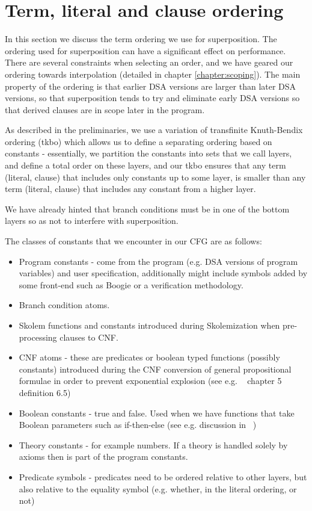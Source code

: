 

\section{Term, literal and clause ordering}\label{section:gfole:ordering}
In this section we discuss the term ordering we use for superposition. The ordering used for superposition can have a significant effect on performance. There are several constraints when selecting an order, and we have geared our ordering towards interpolation (detailed in chapter \ref{chapter:scoping}). The main property of the ordering is that earlier DSA versions are larger than later DSA versions, so that superposition tends to try and eliminate early DSA versions so that derived clauses are in scope later in the program.

As described in the preliminaries, we use a variation of transfinite Knuth-Bendix ordering (tkbo) which allows us to define a separating ordering based on constants - essentially, we partition the constants into sets that we call layers, and define a total order on these layers, and our tkbo ensures that any term (literal, clause) that includes only constants up to some layer, is smaller than any term (literal, clause) that includes any constant from a higher layer.

We have already hinted that branch conditions must be in one of the bottom layers so as not to interfere with superposition.

The classes of constants that we encounter in our CFG are as follows:
\begin{itemize}
	\item Program constants - come from the program (e.g. DSA versions of program variables) and user specification, additionally might include symbols added by some front-end such as Boogie or a verification methodology.
	\item Branch condition atoms.
	\item Skolem functions and constants introduced during Skolemization when pre-processing clauses to CNF.
	\item CNF atoms - these are predicates or boolean typed functions (possibly constants) introduced during the CNF conversion of general propositional formulae in order to prevent exponential explosion (see e.g. ~\cite{RobinsonVoronkov2001} chapter 5 definition 6.5)
	\item Boolean constants - true and false. Used when we have functions that take Boolean parameters such as if-then-else (see e.g. discussion in ~\cite{RegerSudaVoronkov15})
	\item Theory constants - for example numbers. If a theory is handled solely by axioms then is part of the program constants.
	\item Predicate symbols - predicates need to be ordered relative to other layers, but also relative to the equality symbol (e.g. 
	whether, in the literal ordering,  or not)
\end{itemize}

